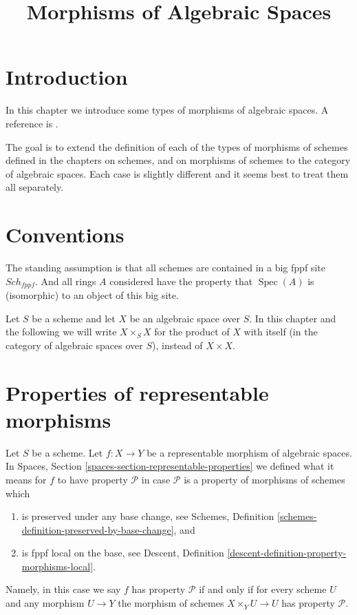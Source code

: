 \documentclass{stacks-project}
\theoremstyle{plain}
\theoremstyle{definition}
\theoremstyle{remark}
\numberwithin{equation}{subsection}
\def\Spec{\mathop{\mathrm{Spec}}}
\def\Sch{\mathit{Sch}}
\begin{document}
\title{Morphisms of Algebraic Spaces}


\maketitle

\label{section-phantom}

\tableofcontents

\section{Introduction}
\label{section-introduction}

\noindent
In this chapter we introduce some types of morphisms of algebraic spaces.
A reference is \cite{Kn}.

\medskip\noindent
The goal is to extend the definition of each of the types of morphisms of
schemes defined in the chapters on schemes, and on morphisms of schemes
to the category of algebraic spaces. Each case is slightly different and
it seems best to treat them all separately.





\section{Conventions}
\label{section-conventions}

\noindent
The standing assumption is that all schemes are contained in
a big fppf site $\Sch_{fppf}$. And all rings $A$ considered
have the property that $\Spec(A)$ is (isomorphic) to an
object of this big site.

\medskip\noindent
Let $S$ be a scheme and let $X$ be an algebraic space over $S$.
In this chapter and the following we will write $X \times_S X$
for the product of $X$ with itself (in the category of algebraic
spaces over $S$), instead of $X \times X$.





\section{Properties of representable morphisms}
\label{section-representable}

\noindent
Let $S$ be a scheme.
Let $f : X \to Y$ be a representable morphism of algebraic spaces. In
Spaces, Section \ref{spaces-section-representable-properties}
we defined what it means for $f$ to
have property $\mathcal{P}$ in case $\mathcal{P}$ is a property
of morphisms of schemes which
\begin{enumerate}
\item is preserved under any base change,
see Schemes, Definition \ref{schemes-definition-preserved-by-base-change},
and
\item is fppf local on the base, see
Descent, Definition \ref{descent-definition-property-morphisms-local}.
\end{enumerate}
Namely, in this case we say $f$ has property $\mathcal{P}$ if and only
if for every scheme $U$ and any morphism $U \to Y$ the morphism of schemes
$X \times_Y U \to U$ has property $\mathcal{P}$.
\end{document}
